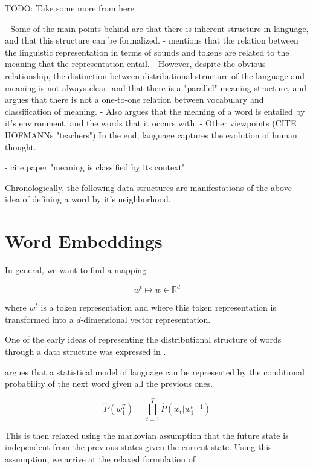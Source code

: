 \documentclass[a4paper,12pt,twoside,openright]{report}
\begin{document}
TODO: Take some more from here

- Some of the main points behind \cite{harris54} are that there is inherent structure in language, and that this structure can be formalized.
- \cite{harris54} mentions that the relation between the linguistic representation in terms of sounds and tokens are related to the meaning that the representation entail.
- However, despite the obvious relationship, the distinction between distributional structure of the language and meaning is not always clear. and that there is a "parallel" meaning structure, and argues that there is not a one-to-one relation between vocabulary and classification of meaning. 
- Also argues that the meaning of a word is entailed by it's environment, and the words that it occurs with.
- Other viewpoints (CITE HOFMANNs "teachers") In the end, language captures the evolution of human thought.

- cite paper "meaning is classified by its context"

Chronologically, the following data structures are manifestations of the above idea of defining a word by it's neighborhood.

\section{Word Embeddings}

In general, we want to find a mapping 

\begin{equation}
w^t \mapsto w \in \mathbb{R}^{d}
\end{equation}

where $w^t$ is a token representation and where this token representation is transformed into a $d$-dimensional vector representation.

One of the early ideas of representing the distributional structure of words through a data structure was expressed in \cite{bengio03}. 

\cite{bengio03} argues that a statistical model of language can be represented by the conditional probability of the next word given all the previous ones.

\begin{equation}
\hat{P}\left(w_{1}^{T}\right)=\prod_{t=1}^{T} \hat{P}\left(w_{t} | w_{1}^{t-1}\right)
\end{equation}{\label{eq:previous_words}}

This is then relaxed using the markovian assumption that the future state is independent from the previous states given the current state.
Using this assumption, we arrive at the relaxed formulation of
\end{document}
